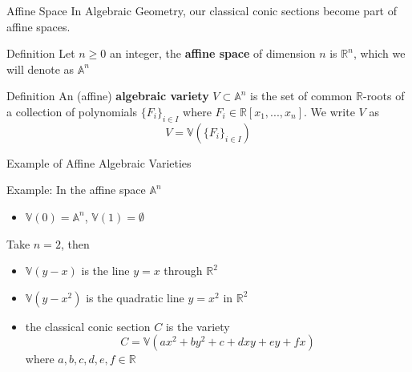 \documentclass[hyperref, notheorems]{beamer}
\newcommand{\Rbb}{\mathbb{R}}
\newcommand{\Abb}{\mathbb{A}}
\newcommand{\Vbb}{\mathbb{V}}
\theoremstyle{definition}
\begin{document}
\begin{frame}{Affine Space}
    In Algebraic Geometry, our classical conic sections become part of affine spaces.
    \begin{block}{Definition}
    Let $n \geq 0$ an integer, the \textbf{affine space} of dimension $n$ is $\Rbb^n$, which we will denote as $\Abb^{n}$
    \end{block}
    
    \begin{block}{Definition}
    An (affine) \textbf{algebraic variety} $V \subset \Abb^{n}$ is the set of common $\Rbb$-roots of a collection of polynomials $\{F_i\}_{i \in I}$ where $F_i \in \Rbb[x_1, ..., x_n]$. We write $V$ as
    \[V = \Vbb(\{F_i\}_{i \in I})\]
    \end{block}
\end{frame}

\begin{frame}{Example of Affine Algebraic Varieties}
    
    \begin{block}{Example:}
        In the affine space $\Abb^{n}$
    \begin{itemize}
        \item $\Vbb(0) = \Abb^{n}$, $\Vbb(1) = \emptyset$
    \end{itemize}
    Take $n = 2$, then
    \begin{itemize}
        \item $\Vbb(y - x)$ is the line $y = x$ through $\Rbb^2$
        \item $\Vbb(y - x^2)$ is the quadratic line $y = x^2$ in $\Rbb^2$
        \item the classical conic section $C$ is the variety
        \[C = \Vbb(ax^2 + by^2 + c + dxy + ey + fx)\]
        where $a, b, c, d, e, f \in \Rbb$
    \end{itemize}
    \end{block}
    
\end{frame}
\end{document}
